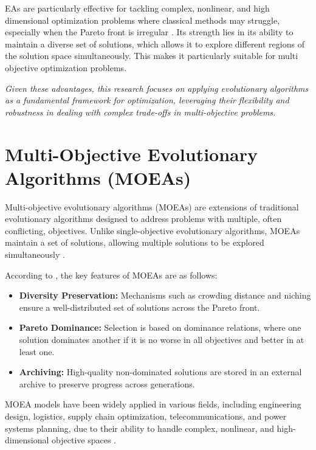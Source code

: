 EAs are particularly effective for tackling complex, nonlinear, and high dimensional optimization problems where classical methods may struggle, especially when the Pareto front is irregular \cite{Evolutionary algorithms in theory and practice}. Its strength lies in its ability to maintain a diverse set of solutions, which allows it to explore different regions of the solution space simultaneously. This makes it particularly suitable for multi objective optimization problems.



\textit{Given these advantages, this research focuses on applying evolutionary algorithms as a fundamental framework for optimization, leveraging their flexibility and robustness in dealing with complex trade-offs in multi-objective problems.}

\section{Multi-Objective Evolutionary Algorithms (MOEAs)}

Multi-objective evolutionary algorithms (MOEAs) are extensions of traditional evolutionary algorithms designed to address problems with multiple, often conflicting, objectives. Unlike single-objective evolutionary algorithms, MOEAs maintain a set of solutions, allowing multiple solutions to be explored simultaneously \citep{Evolutionary Multi-objective Optimization: A Historical View of the Field}.

According to \citep{Evolutionary Multi-objective Optimization: A Historical View of the Field}, the key features of MOEAs are as follows:

\begin{itemize}
    \item \textbf{Diversity Preservation:} Mechanisms such as crowding distance and niching ensure a well-distributed set of solutions across the Pareto front.
    \item \textbf{Pareto Dominance:} Selection is based on dominance relations, where one solution dominates another if it is no worse in all objectives and better in at least one.
    \item \textbf{Archiving:} High-quality non-dominated solutions are stored in an external archive to preserve progress across generations.
\end{itemize}

MOEA models have been widely applied in various fields, including engineering design, logistics, supply chain optimization, telecommunications, and power systems planning, due to their ability to handle complex, nonlinear, and high-dimensional objective spaces \cite{Evolutionary Multi-objective Optimization: A Historical View of the Field}.

